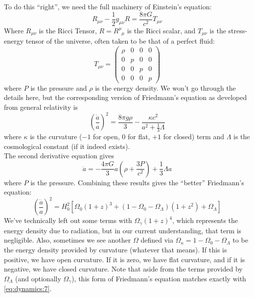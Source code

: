\documentclass[10pt]{article}
\numberwithin{equation}{section}
\newcommand{\n}{\noindent}
\begin{document}
		\n To do this ``right'', we need the full machinery of Einstein's equation:
		\begin{equation}
			\label{eq:dynamics:8} R_{\mu\nu}-\frac{1}{2}g_{\mu\nu}R = \frac{8\pi G}{c^2}T_{\mu\nu}
		\end{equation}
		Where $R_{\mu\nu}$ is the Ricci Tensor, $R=R^\mu_{\phantom{\mu}\mu}$ is the Ricci scalar, and $T_{\mu\nu}$ is the stress-energy tensor of the universe, often taken to be that of a perfect fluid:
		\begin{equation}
			\label{eq:dynamics:9}
			T_{\mu\nu} = \begin{pmatrix}
			\rho & 0 & 0 & 0\\
			0 & p & 0 & 0\\
			0 & 0 & p & 0\\
			0 & 0 & 0 & p \end{pmatrix}
		\end{equation}
		where $P$ is the pressure and $\rho$ is the energy density. We won't go through the details here, but the corresponding version of Friedmann's equation as developed from general relativity is
		\begin{equation}
			\label{eq:dynamics:10} \left(\frac{\dot{a}}{a}\right)^2 = \frac{8\pi g\rho}{3}-\frac{\kappa c^2}{a^2 + \frac{1}{3}\Lambda}
		\end{equation}
		where $\kappa$ is the curvature ($-1$ for open, $0$ for flat, $+1$ for closed) term and $\Lambda$ is the cosmological constant (if it indeed exists).\\
		
		\n The second derivative equation gives
		\begin{equation}
			\label{eq:dynamics:11} \ddot{a} = -\frac{4\pi G}{3}a\left(\rho + \frac{3P}{c^2}\right)+\frac{1}{3}\Lambda a
		\end{equation}
		where $P$ is the pressure. Combining these results gives the ``better'' Friedmann's equation:
		\begin{equation}
			\label{eq:dynamics:12}\boxed{\left(\frac{\dot{a}}{a}\right)^2 = H_0^2\left[\Omega_0\left(1+z\right)^3+(1-\Omega_0-\Omega_\Lambda)(1+z^2) + \Omega_\Lambda\right]}
		\end{equation}
		We've technically left out some terms with $\Omega_\gamma(1+z)^4$, which represents the energy density due to radiation, but in our current understanding, that term is negligible. Also, sometimes we see another $\Omega$ defined via $\Omega_\kappa = 1-\Omega_0-\Omega_\Lambda$ to be the energy density provided by curvature (whatever that means). If this is positive, we have open curvature. If it is zero, we have flat curvature, and if it is negative, we have closed curvature. Note that aside from the terms provided by $\Omega_\Lambda$ (and optionally $\Omega_\gamma$), this form of Friedmann's equation matches exactly with \eqref{eq:dynamics:7}.\\
		
\end{document}
